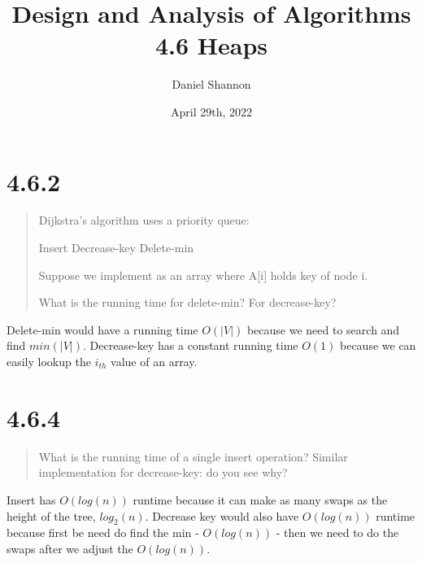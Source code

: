 \documentclass[12pt, letterpaper, twoside]{article}
\title{%
Design and Analysis of Algorithms\\
\large 4.6 Heaps
}
\author{Daniel Shannon}
\date{April 29th, 2022}
\begin{document}
\begin{titlepage}
\maketitle
\end{titlepage}

\section*{4.6.2}

\begin{quote}
    Dijkstra's algorithm uses a priority queue:

    Insert
    Decrease-key
    Delete-min
    
    Suppose we implement as an array where A[i] holds key of node i.
    
    What is the running time for delete-min? For decrease-key?
\end{quote}

Delete-min would have a running time $O(|V|)$ because we need to search and find $min(|V|)$.
Decrease-key has a constant running time $O(1)$ because we can easily lookup the $i_{th}$ value 
of an array.


\section*{4.6.4}

\begin{quote}
    What is the running time of a single insert operation?
    Similar implementation for decrease-key: do you see why?
\end{quote}

Insert has $O(log(n))$ runtime because it can make as many swaps as the height of the tree, $log_2(n)$.
Decrease key would also have $O(log(n))$ runtime because first be need do find the min - $O(log(n))$ - 
then we need to do the swaps after we adjust the  $O(log(n))$.
\end{document}
